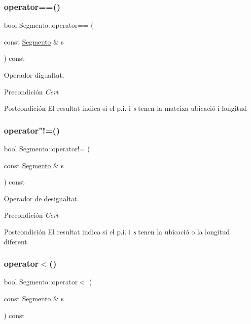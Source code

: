 \subsubsection{\texorpdfstring{operator==()}{operator==()}}
{\footnotesize\ttfamily bool Segmento\+::operator== (\begin{DoxyParamCaption}\item[{const \hyperlink{class_segmento}{Segmento} \&}]{s }\end{DoxyParamCaption}) const}



Operador d\textquotesingle{}igualtat. 

\begin{DoxyPrecond}{Precondición}
{\itshape Cert} 
\end{DoxyPrecond}
\begin{DoxyPostcond}{Postcondición}
El resultat indica si el p.\+i. i {\itshape s} tenen la mateixa ubicació i longitud 
\end{DoxyPostcond}
\mbox{\label{class_segmento_a77db9ed1b0a50b2cc1783c57a25f359a}} 
\subsubsection{\texorpdfstring{operator"!=()}{operator!=()}}
{\footnotesize\ttfamily bool Segmento\+::operator!= (\begin{DoxyParamCaption}\item[{const \hyperlink{class_segmento}{Segmento} \&}]{s }\end{DoxyParamCaption}) const}



Operador de desigualtat. 

\begin{DoxyPrecond}{Precondición}
{\itshape Cert} 
\end{DoxyPrecond}
\begin{DoxyPostcond}{Postcondición}
El resultat indica si el p.\+i. i {\itshape s} tenen la ubicació o la longitud diferent 
\end{DoxyPostcond}
\mbox{\label{class_segmento_a780e43a2c06be2e098753cd5133f630b}} 
\subsubsection{\texorpdfstring{operator$<$()}{operator<()}}
{\footnotesize\ttfamily bool Segmento\+::operator$<$ (\begin{DoxyParamCaption}\item[{const \hyperlink{class_segmento}{Segmento} \&}]{s }\end{DoxyParamCaption}) const}



